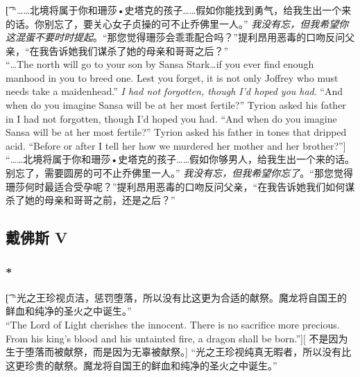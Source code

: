 \documentclass[12pt,a4paper]{article}
\newcommand{\h}[1]{{\color{red}#1}\\}
\newcommand{\la}[1]{{\color{blue}#1}\\}
\begin{document}
\subsubsection{}\t[
	“……北境将属于你和珊莎•史塔克的孩子……假如你能找到勇气，给我生出一个来的话。你别忘了，要关心女子贞操的可不止乔佛里一人。”
	\emph{我没有忘，但我希望你这混蛋不要时时提起}。“那您觉得珊莎会乖乖配合吗？”提利昂用恶毒的口吻反问父亲，“在我告诉她我们谋杀了她的母亲和哥哥之后？”\\
	“\ldots The north will go to your son by Sansa Stark\ldots if you ever find enough manhood in you to breed one. Lest you forget, it is not only Joffrey who must needs take a maidenhead.”
	\emph{I had not forgotten, though I'd hoped you had}. “And when do you imagine Sansa will be at her most fertile?” Tyrion asked his father in I had not forgotten, though I'd hoped you had. “And when do you imagine Sansa will be at her most fertile?” Tyrion asked his father in tones that dripped acid. “Before or after I tell her how we murdered her mother and her brother?”]
	“……北境将属于你和珊莎•史塔克的孩子……假如你够男人，给我生出一个来的话。别忘了，需要圆房的可不止乔佛里一人。”
	\emph{我没有忘，但我希望你忘了}。“那您觉得珊莎何时最适合受孕呢？”提利昂用恶毒的口吻反问父亲，“在我告诉她我们如何谋杀了她的母亲和哥哥之前，还是之后？”
	
	
\subsection{戴佛斯 V}

\subsubsection{\color{red}*}\t[
	“光之王珍视贞洁，惩罚堕落，所以没有比这更为合适的献祭。魔龙将自国王的鲜血和纯净的圣火之中诞生。”\\
	“The Lord of Light cherishes the innocent. There is no sacrifice more precious. From his king's blood and his untainted fire, a dragon shall be born.”][
	不是因为生于堕落而被献祭，而是因为无辜被献祭。]
	“光之王珍视纯真无暇者，所以没有比这更珍贵的献祭。魔龙将自国王的鲜血和纯净的圣火之中诞生。”
	
\end{document}
